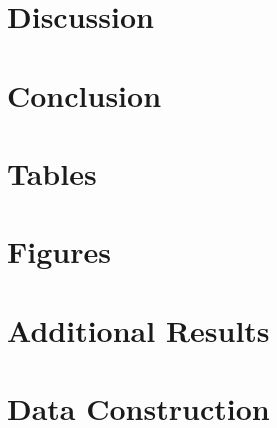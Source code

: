 \documentclass[12pt]{article}
\begin{document}
\section{Discussion}
\label{sec:discussion}

\section{Conclusion}
\label{sec:conclusion}


\clearpage
\singlespacing
\setlength{\bibsep}{0pt}


   


\clearpage
\onehalfspacing

\section*{Tables}


\clearpage

\section*{Figures}



\clearpage
\begin{appendices}
\onehalfspacing

\section{Additional Results}
\label{appendix:A}

\section{Data Construction}
\label{appendix:B}

\end{appendices}
\end{document}
